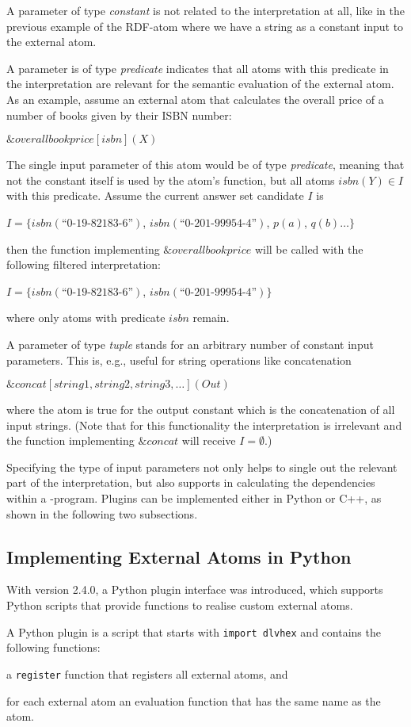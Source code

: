 \documentclass[a4paper, titlepage]{article}
\newcommand{\mi}[1]{\mathit{#1}}
\newcommand{\amp}[1]{\ensuremath{\&{\mathit{#1}}}}
\newcommand{\ext}[3]{\ensuremath{\&{\mathit{#1}}[#2](#3)}}
\newcommand\mycenterline[1]{\par\smallskip\centerline{#1} \smallskip}
\begin{document}
A parameter of type \emph{constant} is not related to the 
interpretation at all, like in the previous example of the 
RDF-atom where we have a string as a constant input to the external atom. 

A parameter is of type \emph{predicate} indicates that 
all atoms with this predicate in the interpretation are 
relevant for the semantic evaluation of the external atom.
%
%
As an example, assume an external 
atom that calculates the overall price of a number of books 
given by their ISBN number:
\mycenterline{$\ext{overallbookprice}{isbn}{X}$}
The single input parameter of this atom would be of type 
\emph{predicate}, meaning that not the constant itself is 
used by the atom's function,
but all atoms $\mi{isbn}(Y) \in I$ with this predicate.
Assume the current answer set candidate $I$ is
\mycenterline{$I = \{ \mi{isbn}(\textit{``0-19-82183-6''})$,
  $\mi{isbn}(\textit{``0-201-99954-4''})$, $p(a)$, $q(b) \dots\}$}
\noindent
then the function implementing $\amp{overallbookprice}$
will be called with the following filtered interpretation:
\mycenterline{$I = \{ \mi{isbn}(\textit{``0-19-82183-6''})$,
  $\mi{isbn}(\textit{``0-201-99954-4''}) \}$}
\noindent
where only atoms with predicate $\mi{isbn}$ remain.

A parameter of type \emph{tuple} stands for
an arbitrary number of constant input parameters.
This is, e.g., useful for string operations like concatenation
\mycenterline{$\ext{concat}{string1, string2, string3, \dots}{Out}$}
\noindent
where the atom is true for the output constant
which is the concatenation of all input strings.
(Note that for this functionality the interpretation is irrelevant
and the function implementing $\amp{concat}$ will receive $I=\emptyset$.)

Specifying the type of input parameters not only helps to 
single out the relevant part of the interpretation, but 
also supports \dlvhex{} in calculating the dependencies 
within a \hex-program. Plugins can be implemented either in Python or C++, as shown in the following two subsections.

\subsection{Implementing External Atoms in Python}
With \dlvhex{} version 2.4.0, a Python plugin interface was 
introduced, which supports Python scripts that provide 
functions to realise custom external atoms.

A Python plugin is a script that starts with
\verb|import dlvhex| and contains the following functions:
\begin{compactitem}
\item
  a \verb|register| function
  that registers all external atoms, and
\item
  for each external atom an evaluation function
  that has the same name as the atom.
\end{compactitem}
\end{document}
